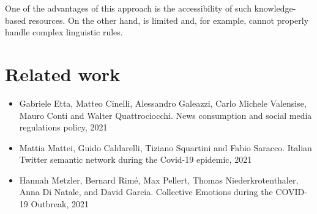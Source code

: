 One of the advantages of this approach is the accessibility of such knowledge-based resources. On the other hand, is limited and, for example, cannot properly handle complex linguistic rules.

\section{Related work}
\label{sec:related-work}

\begin{itemize}
	\item Gabriele Etta, Matteo Cinelli, Alessandro Galeazzi, Carlo Michele Valensise, Mauro Conti and Walter Quattrociocchi. News consumption and social media regulations policy, 2021
	\item Mattia Mattei, Guido Caldarelli, Tiziano Squartini and Fabio Saracco. Italian Twitter semantic network during the Covid-19 epidemic, 2021
	\item Hannah Metzler, Bernard Rimé, Max Pellert, Thomas Niederkrotenthaler, Anna Di Natale, and David Garcia. Collective Emotions during the COVID-19 Outbreak, 2021
\end{itemize}